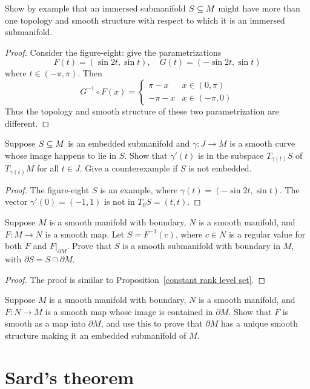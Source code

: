 \begin{exercise}
Show by example that an immersed submanifold $S\subseteq M$ might have more than one topology and smooth structure with respect to which it is an immersed submanifold.
\end{exercise}
\begin{proof}
Consider the figure-eight: give the parametrizations
\[F(t)=(\sin 2t,\sin t),\quad G(t)=(-\sin 2t,\sin t)\]
where $t\in(-\pi,\pi)$. Then 
\[G^{-1}\circ F(x)=\begin{cases}
\pi-x&x\in(0,\pi)\\
-\pi-x&x\in(-\pi,0)
\end{cases}\]
Thus the topology and smooth structure of these two parametrization are different.
\end{proof}
\begin{exercise}
Suppose $S\subseteq M$ is an embedded submanifold and $\gamma:J\to M$ is a smooth curve whose image happens to lie in $S$. Show that $\gamma'(t)$ is in the subspace $T_{\gamma(t)}S$ of $T_{\gamma(t)}M$ for all $t\in J$. Give a counterexample if $S$ is not embedded.
\end{exercise}
\begin{proof}
The figure-eight $S$ is an example, where $\gamma(t)=(-\sin 2t,\sin t)$. The vector $\gamma'(0)=(-1,1)$ is not in $T_0S=(t,t)$.
\end{proof}
\begin{exercise}
Suppose $M$ is a smooth manifold with boundary, $N$ is a smooth manifold, and $F:M\to N$ is a smooth map. Let $S=F^{-1}(c)$, where $c\in N$ is a regular value for both $F$ and $F|_{\partial M}$. Prove that $S$ is a smooth submanifold with boundary in $M$, with $\partial S=S\cap\partial M$.
\end{exercise}
\begin{proof}
The proof is similar to Proposition~\ref{constant rank level set}.
\end{proof}
\begin{exercise}
Suppose $M$ is a smooth manifold with boundary, $N$ is a smooth manifold, and $F:N\to M$ is a smooth map whose image is contained in $\partial M$. Show that $F$ is smooth as a map into $\partial M$, and use this to prove that $\partial M$ has a unique smooth structure making it an embedded submanifold of $M$.
\end{exercise}
\chapter{Sard's theorem}
